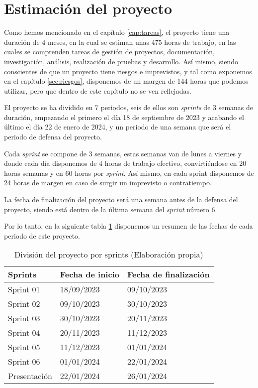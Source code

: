 \section{Estimación del proyecto}
\label{sec:estimacion}


Como hemos mencionado en el capítulo \ref{cap:tareas}, el proyecto tiene una duración
de 4 meses, en la cual se estiman unas 475 horas de trabajo, en las cuales se comprenden
tareas de gestión de proyectos, documentación, investigación, análisis, realización de
pruebas y desarrollo. Así mismo, siendo conscientes de que un proyecto tiene riesgos e
imprevistos, y tal como exponemos en el capítulo \ref{sec:riesgos}, disponemos de un margen
de 144 horas que podemos utilizar, pero que dentro de este capítulo no se ven reflejadas.

El proyecto se ha dividido en 7 periodos, seis de ellos son \textit{sprints} de 3 semanas
de duración, empezando el primero el día 18 de septiembre de 2023 y acabando el último
el día 22 de enero de 2024, y un periodo de una semana que será el periodo de defensa del proyecto.

Cada \textit{sprint} se compone de 3 semanas, estas semanas van de lunes a viernes y donde
cada día disponemos de 4 horas de trabajo efectivo, convirtiéndose en 20 horas semanas
y en 60 horas por \textit{sprint}. Así mismo, en cada sprint disponemos de 24 horas de
margen en caso de surgir un imprevisto o contratiempo.

La fecha de finalización del proyecto será una semana antes de la defensa del proyecto,
siendo está dentro de la última semana del \textit{sprint} número 6.

Por lo tanto, en la siguiente tabla \ref{tab:proyecto_estimacion} disponemos un resumen de
las fechas de cada periodo de este proyecto.

\begin{table}[H]
    \centering
    \begin{tabular}{|l|l|l|}
    \hline
    \rowcolor[HTML]{8EA9D8} 
    Sprints      & Fecha de inicio & Fecha de finalización \\ \hline
    Sprint 01    & 18/09/2023      & 09/10/2023            \\ \hline
    Sprint 02    & 09/10/2023      & 30/10/2023            \\ \hline
    Sprint 03    & 30/10/2023      & 20/11/2023            \\ \hline
    Sprint 04    & 20/11/2023      & 11/12/2023            \\ \hline
    Sprint 05    & 11/12/2023      & 01/01/2024            \\ \hline
    Sprint 06    & 01/01/2024      & 22/01/2024            \\ \hline
    Presentación & 22/01/2024      & 26/01/2024            \\ \hline
    \end{tabular}
    \caption[División del proyecto por sprints]{División del proyecto por sprints (Elaboración propia)}
    \label{tab:proyecto_estimacion}
\end{table}


